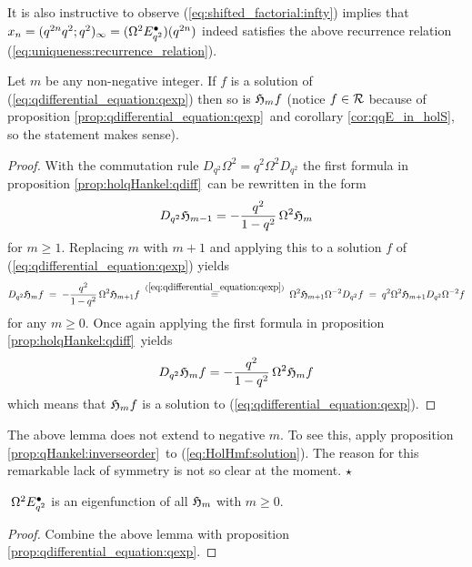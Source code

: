 It is also instructive to observe (\ref{eq:shifted_factorial:infty}) implies that
$x_n = (q^{2n} q^2; q^2)_\infty = (\Omega^2 E_{q^2}^\bullet)(q^{2n})$ indeed satisfies the
above recurrence relation (\ref{eq:uniqueness:recurrence_relation}).

\begin{lemma}
Let $m$ be any non-negative integer. If $f$ is a solution of (\ref{eq:qdifferential_equation:qexp})
then so is $\mathfrak{H}_{m}f$ (notice $f\in \mathcal R$ because of proposition
\ref{prop:qdifferential_equation:qexp}\ and corollary \ref{cor:qqE_in_holS},
so the statement makes sense).
\end{lemma}
\begin{proof}
With the commutation rule $D_{q^2} \Omega^2 = q^2 \Omega^2 D_{q^2}$
the first formula in proposition \ref{prop:holqHankel:qdiff}\ can be
rewritten in the form
\begin{equation}\label{eq:holqHankel:qdiff:rewritten:bis}
    D_{q^2} \mathfrak{H}_{m-1} = -\frac{q^2}{1-q^2}\, \Omega^2 \mathfrak{H}_{m}
\end{equation}
for $m\geq 1$. Replacing $m$ with $m+1$ and applying this to a solution $f$ of
(\ref{eq:qdifferential_equation:qexp}) yields
$$  D_{q^2} \mathfrak{H}_{m} f
     \;=\; -\frac{q^2}{1-q^2}\, \Omega^2 \mathfrak{H}_{m+1} f
     \;\stackrel{(\ref{eq:qdifferential_equation:qexp})}{=}\;
             \Omega^2 \mathfrak{H}_{m+1} \Omega^{-2} D_{q^2} f
     \;=\; q^2 \Omega^2 \mathfrak{H}_{m+1} D_{q^2} \Omega^{-2} f $$
for any $m\geq 0$. Once again applying the first formula in
proposition \ref{prop:holqHankel:qdiff}\ yields
\begin{equation}\label{eq:HolHmf:solution}
   D_{q^2} \mathfrak{H}_{m} f  =  -\frac{q^2}{1-q^2}\, \Omega^2 \mathfrak{H}_{m} f
\end{equation}
which means that $\mathfrak{H}_{m}f$ is a solution to (\ref{eq:qdifferential_equation:qexp}).
\end{proof}

\begin{remark} \rm
The above lemma does not extend to negative $m$. To see this,
apply proposition \ref{prop:qHankel:inverseorder}\ to (\ref{eq:HolHmf:solution}).
The reason for this remarkable lack of symmetry is not so clear at the moment.
$\hfill \star$
\end{remark}

\begin{prop} \label{prop:qqE:eigenfunction_qHankel}
$\;\Omega^2 E_{q^2}^\bullet$ is an eigenfunction of all $\mathfrak{H}_{m}$ with $m\geq 0$.
\end{prop}
\begin{proof}
Combine the above lemma with proposition \ref{prop:qdifferential_equation:qexp}\@.
\end{proof}

